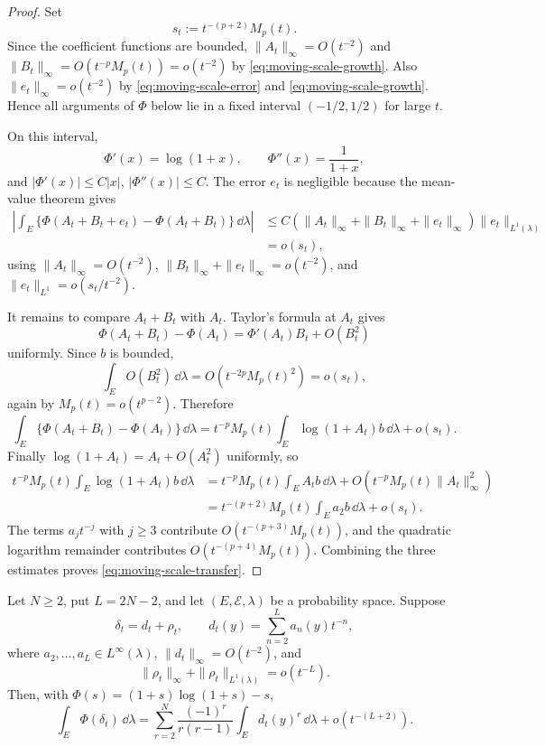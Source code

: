 \ifdefined\JFAArticleMain
{}
\else
\begin{proof}
Set
\[
  s_t:=t^{-(p+2)}M_p(t).
\]
Since the coefficient functions are bounded,
\(\|A_t\|_\infty=O(t^{-2})\) and
\(\|B_t\|_\infty=O(t^{-p}M_p(t))=o(t^{-2})\) by
\eqref{eq:moving-scale-growth}.  Also
\(\|e_t\|_\infty=o(t^{-2})\) by
\eqref{eq:moving-scale-error} and \eqref{eq:moving-scale-growth}.  Hence all
arguments of \(\Phi\) below lie in a fixed interval \((-1/2,1/2)\) for large
\(t\).

On this interval,
\[
  \Phi'(x)=\log(1+x),\qquad \Phi''(x)=\frac1{1+x},
\]
and \(|\Phi'(x)|\le C|x|\), \(|\Phi''(x)|\le C\).  The error \(e_t\) is
negligible because the mean-value theorem gives
\[
\begin{aligned}
\left|\int_E\{\Phi(A_t+B_t+e_t)-\Phi(A_t+B_t)\}\,\dd\lambda\right|
&\le
C(\|A_t\|_\infty+\|B_t\|_\infty+\|e_t\|_\infty)\|e_t\|_{L^1(\lambda)}\\
&=o(s_t),
\end{aligned}
\]
using \(\|A_t\|_\infty=O(t^{-2})\),
\(\|B_t\|_\infty+\|e_t\|_\infty=o(t^{-2})\), and
\(\|e_t\|_{L^1}=o(s_t/t^{-2})\).

It remains to compare \(A_t+B_t\) with \(A_t\).  Taylor's formula at \(A_t\)
gives
\[
\Phi(A_t+B_t)-\Phi(A_t)
=\Phi'(A_t)B_t+O(B_t^2)
\]
uniformly.  Since \(b\) is bounded,
\[
  \int_E O(B_t^2)\,\dd\lambda
  =O(t^{-2p}M_p(t)^2)
  =o(s_t),
\]
again by \(M_p(t)=o(t^{p-2})\).  Therefore
\[
  \int_E\{\Phi(A_t+B_t)-\Phi(A_t)\}\,\dd\lambda
  =
  t^{-p}M_p(t)\int_E\log(1+A_t)b\,\dd\lambda+o(s_t).
\]
Finally \(\log(1+A_t)=A_t+O(A_t^2)\) uniformly, so
\[
\begin{aligned}
t^{-p}M_p(t)\int_E\log(1+A_t)b\,\dd\lambda
&=
t^{-p}M_p(t)\int_EA_tb\,\dd\lambda+O(t^{-p}M_p(t)\|A_t\|_\infty^2)\\
&=
t^{-(p+2)}M_p(t)\int_Ea_2b\,\dd\lambda+o(s_t).
\end{aligned}
\]
The terms \(a_jt^{-j}\) with \(j\ge3\) contribute \(O(t^{-(p+3)}M_p(t))\),
and the quadratic logarithm remainder contributes \(O(t^{-(p+4)}M_p(t))\).
Combining the three estimates proves \eqref{eq:moving-scale-transfer}.
\end{proof}
\fi

\begin{proposition}%
\label{prop:finite-density-jet-entropy-transfer}
Let \(N\ge2\), put \(L=2N-2\), and let \((E,\mathcal E,\lambda)\) be a
probability space.  Suppose
\[
\delta_t=d_t+\rho_t,\qquad
d_t(y)=\sum_{n=2}^{L}a_n(y)t^{-n},
\]
where \(a_2,\ldots,a_L\in L^\infty(\lambda)\),
\(\|d_t\|_\infty=O(t^{-2})\), and
\[
\|\rho_t\|_\infty+\|\rho_t\|_{L^1(\lambda)}=o(t^{-L}).
\]
Then, with \(\Phi(s)=(1+s)\log(1+s)-s\),
\[
\int_E\Phi(\delta_t)\,\dd\lambda
=
\sum_{r=2}^{N}\frac{(-1)^r}{r(r-1)}
\int_E d_t(y)^r\,\dd\lambda
+o(t^{-(L+2)}).
\]
\end{proposition}

